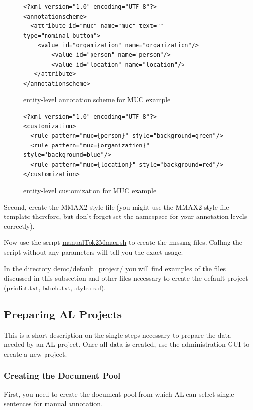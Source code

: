 \documentclass[DIV12,english,11pt,halfparskip]{scrartcl}
\begin{document}
\begin{appendix}
\begin{figure}[h]
\begin{verbatim}
<?xml version="1.0" encoding="UTF-8"?>
<annotationscheme>
  <attribute id="muc" name="muc" text="" type="nominal_button">
    <value id="organization" name="organization"/>
        <value id="person" name="person"/>
        <value id="location" name="location"/>
   </attribute>
</annotationscheme>
\end{verbatim}
\label{fig:muc_schema}
\caption{entity-level annotation scheme for MUC example}
\end{figure}

\begin{figure}[h]
\begin{verbatim}
<?xml version="1.0" encoding="UTF-8"?>
<customization>
  <rule pattern="muc={person}" style="background=green"/>
  <rule pattern="muc={organization}" style="background=blue"/>
  <rule pattern="muc={location}" style="background=red"/>
</customization>
\end{verbatim}
\label{fig:muc_cust}
\caption{entity-level customization for MUC example}
\end{figure}

Second, create the MMAX2 style file (you might use the MMAX2 style-file
template therefore, but don't forget set the namespace for your
annotation levels correctly).

Now use the script \url{manualTok2Mmax.sh} to create the missing
files. Calling the script without any parameters will tell you the
exact usage.

In the directory \url{demo/default_project/} you will find examples of
the files discussed in this subsection and other files necessary to
create the default project (priolist.txt, labels.txt, styles.xsl).


\subsection{Preparing AL Projects}

This is a short description on the single steps necessary to prepare
the data needed by an AL project. Once all data is created, use the
administration GUI to create a new project.

\subsubsection{Creating the Document Pool}
First, you need to create the document pool from which AL can select
single sentences for manual annotation.


\end{appendix}
\end{document}
